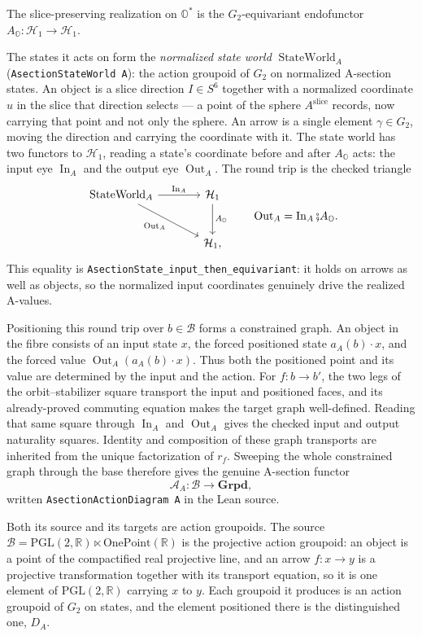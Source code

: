 \documentclass[11pt]{article}
\newcommand{\OO}{\mathbb{O}}
\newcommand{\RR}{\mathbb{R}}
\newcommand{\Ostar}{\OO^{*}}
\theoremstyle{plain}
\theoremstyle{definition}
\theoremstyle{remark}
\begin{document}
\begin{tcolorbox}
The slice-preserving realization on $\Ostar$ is the $G_2$-equivariant endofunctor
$A_{\OO}:\mathcal H_1\to\mathcal H_1$.

The states it acts on form the \emph{normalized state world}
$\operatorname{StateWorld}_A$ \textup{(}\texttt{AsectionStateWorld\,A}\textup{)}:
the action groupoid of $G_2$ on normalized A-section states. An object is a
slice direction $I\in S^6$ together with a normalized coordinate $u$ in the
slice that direction selects --- a point of the sphere $A^{\mathrm{slice}}$
records, now carrying that point and not only the sphere. An arrow is a single
element $\gamma\in G_2$, moving the direction and carrying the coordinate with
it. The state world has two functors to $\mathcal H_1$, reading a state's
coordinate before and after $A_{\OO}$ acts: the input eye
$\operatorname{In}_A$ and the output eye $\operatorname{Out}_A$.
The round trip is the checked triangle
\[
\begin{tikzcd}[column sep=large,row sep=large]
\operatorname{StateWorld}_A
  \arrow[r,"\operatorname{In}_A"]
  \arrow[dr,"\operatorname{Out}_A"'] &
\mathcal H_1 \arrow[d,"A_{\OO}"]\\
& \mathcal H_1,
\end{tikzcd}
\qquad
\operatorname{Out}_A=\operatorname{In}_A\fatsemi A_{\OO}.
\]
This equality is
\texttt{AsectionState\_input\_then\_equivariant}: it holds on arrows as well as objects, so
the normalized input coordinates genuinely drive the realized A-values.

Positioning this round trip over $b\in\mathcal B$ forms a constrained graph. An object in the
fibre consists of an input state $x$, the forced positioned state
$a_A(b)\cdot x$, and the forced value
$\operatorname{Out}_A(a_A(b)\cdot x)$. Thus both the positioned point and its value are determined
by the input and the action. For $f:b\to b'$, the two legs of the orbit--stabilizer square transport the input
and positioned faces, and its already-proved commuting equation makes the target graph
well-defined. Reading that same square through $\operatorname{In}_A$ and
$\operatorname{Out}_A$ gives the checked input and output naturality squares. Identity and
composition of these graph transports are inherited from the unique factorization of $r_f$.
Sweeping the whole constrained graph through the base therefore gives the genuine A-section
functor
\[
  \mathcal A_A:\mathcal B\longrightarrow\mathbf{Grpd},
\]
written \texttt{AsectionActionDiagram\,A} in the Lean source.

Both its source and its targets are action groupoids. The source
$\mathcal B=\mathrm{PGL}(2,\RR)\ltimes\mathrm{OnePoint}(\RR)$ is the projective
action groupoid: an object is a point of the compactified real projective line,
and an arrow $f:x\to y$ is a projective transformation together with its
transport equation, so it is one element of $\mathrm{PGL}(2,\RR)$ carrying $x$
to $y$. Each groupoid it produces is an action groupoid of $G_2$ on states, and
the element positioned there is the distinguished one, $D_A$.


\end{tcolorbox}
\end{document}
